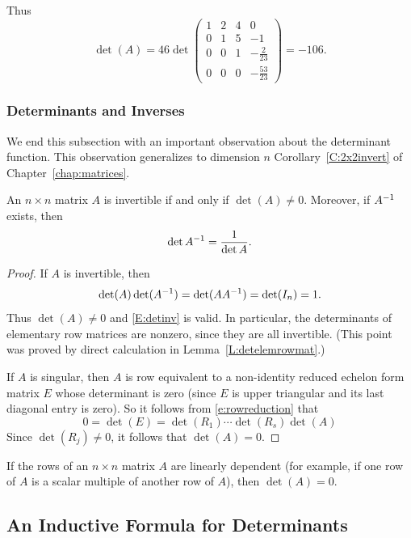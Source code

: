 \documentclass{ximera}
\begin{document}
Thus
\[
\det(A) = 46\det\left(\begin{array}{rrrr} 1 & 2 & 4 & 0\\ 0 & 1 & 5 & -1 \\
0 & 0 & 1 & -\frac{2}{23} \\ 0 & 0 & 0 & -\frac{53}{23} \end{array}\right)
= -106.
\]  

\subsubsection*{Determinants and Inverses}

We end this subsection with an important observation about the
determinant function.  This observation generalizes to dimension
$n$ Corollary~\ref{C:2x2invert} of Chapter~\ref{chap:matrices}. 
\begin{theorem}  \label{T:detandinv}
An $n\times n$ matrix $A$ is invertible if and only if $\det(A)\neq 0$.
Moreover, if $A^{-1}$ exists, then 
\begin{equation}  \label{E:detinv}
\det A^{-1} = \frac{1}{\det A}.
\end{equation}
\end{theorem} 
 
\begin{proof}  If $A$ is invertible, then 
\[
\det(A)\det(A^{-1}) = \det(AA^{-1}) = \det(I_n) =1.
\]
Thus $\det(A)\neq 0$ and \eqref{E:detinv} is valid. In particular, the 
determinants of elementary row matrices are nonzero, since they are all
invertible. (This point was proved by direct calculation in
Lemma~\ref{L:detelemrowmat}.)
 
If $A$ is singular, then $A$ is row equivalent to a non-identity
reduced echelon form matrix $E$ whose determinant is zero (since
$E$ is upper triangular and its last diagonal entry is zero).
So it follows from
\eqref{e:rowreduction} that 
\[
0=\det(E) = \det(R_1)\cdots\det(R_s)\det(A)
\]
Since $\det(R_j)\neq 0$, it follows that $\det(A)=0$.  \end{proof}

\begin{corollary}
If the rows of an $n\times n$ matrix $A$ are linearly dependent (for example,
if one row of $A$ is a scalar multiple of another row of $A$), then 
$\det(A)=0$.
\end{corollary}


\subsection*{An Inductive Formula for Determinants} 
 
\end{document}
